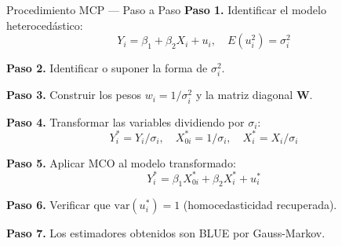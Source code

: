 \documentclass[12pt,a4paper]{article}
\begin{document}
\begin{definicion}{Procedimiento MCP --- Paso a Paso}
\textbf{Paso 1.} Identificar el modelo heterocedástico:
\[Y_i = \beta_1 + \beta_2 X_i + u_i, \quad E(u_i^2) = \sigma_i^2\]

\textbf{Paso 2.} Identificar o suponer la forma de $\sigma_i^2$.

\textbf{Paso 3.} Construir los pesos $w_i = 1/\sigma_i^2$ y la matriz diagonal $\mathbf{W}$.

\textbf{Paso 4.} Transformar las variables dividiendo por $\sigma_i$:
\[Y_i^* = Y_i/\sigma_i, \quad X_{0i}^* = 1/\sigma_i, \quad X_i^* = X_i/\sigma_i\]

\textbf{Paso 5.} Aplicar MCO al modelo transformado:
\[Y_i^* = \beta_1 X_{0i}^* + \beta_2 X_i^* + u_i^*\]

\textbf{Paso 6.} Verificar que $\text{var}(u_i^*) = 1$ (homocedasticidad recuperada).

\textbf{Paso 7.} Los estimadores obtenidos son BLUE por Gauss-Markov.
\end{definicion}
\end{document}
